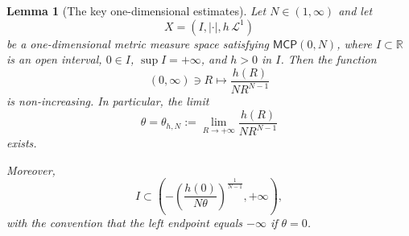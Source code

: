 \documentclass[a4paper,10pt]{article}
\newcommand{\MCP}{\mathsf{MCP}}
\theoremstyle{plain}
\newtheorem{lemma}{Lemma}[section]
\theoremstyle{definition}
\numberwithin{equation}{section}
\begin{document}
\begin{lemma}[The key one-dimensional estimates]\label{lem:MCP-asymptotic-bound}
Let $N\in(1,\infty)$ and let
\[
X=(I,|\cdot|,h\,\mathcal L^1)
\]
be a one-dimensional metric measure space satisfying $\MCP(0,N)$,
where $I\subset\mathbb R$ is an open interval, $0\in I$,
$\sup I=+\infty$, and $h>0$ in $I$.
Then the function
\[
(0,\infty)\ni R\longmapsto
\frac{h(R)}{N R^{N-1}}
\]
is non-increasing. In particular, the limit
\[
\theta=\theta_{h,N}
:=
\lim_{R\to+\infty}\frac{h(R)}{N R^{N-1}}
\]
exists.

Moreover,
\begin{equation}\label{eq:MCP-past-bound}
I\subset
\left(
-\left(\frac{h(0)}{N\theta}\right)^{\frac1{N-1}},
+\infty
\right),
\end{equation}
with the convention that the left endpoint equals $-\infty$ if
$\theta=0$.
\end{lemma}
\end{document}
